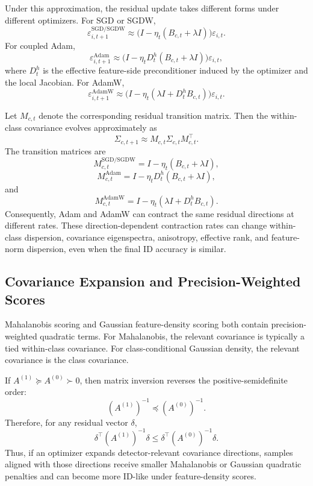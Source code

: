 Under this approximation, the residual update takes different forms under
different optimizers. For SGD or SGDW,
\[
    \varepsilon_{i,t+1}^{\mathrm{SGD/SGDW}}
    \approx
    \bigl(I-\eta_t(B_{c,t}+\lambda I)\bigr)\varepsilon_{i,t}.
\]
For coupled Adam,
\[
    \varepsilon_{i,t+1}^{\mathrm{Adam}}
    \approx
    \bigl(I-\eta_tD_t^h(B_{c,t}+\lambda I)\bigr)\varepsilon_{i,t},
\]
where \(D_t^h\) is the effective feature-side preconditioner induced by the
optimizer and the local Jacobian. For AdamW,
\[
    \varepsilon_{i,t+1}^{\mathrm{AdamW}}
    \approx
    \bigl(I-\eta_t(\lambda I+D_t^hB_{c,t})\bigr)\varepsilon_{i,t}.
\]

Let \(M_{c,t}\) denote the corresponding residual transition matrix. Then the
within-class covariance evolves approximately as
\[
    \Sigma_{c,t+1}
    \approx
    M_{c,t}\Sigma_{c,t}M_{c,t}^{\top}.
\]
The transition matrices are
\[
    M_{c,t}^{\mathrm{SGD/SGDW}}
    =
    I-\eta_t(B_{c,t}+\lambda I),
\]
\[
    M_{c,t}^{\mathrm{Adam}}
    =
    I-\eta_tD_t^h(B_{c,t}+\lambda I),
\]
and
\[
    M_{c,t}^{\mathrm{AdamW}}
    =
    I-\eta_t(\lambda I+D_t^hB_{c,t}).
\]
Consequently, Adam and AdamW can contract the same residual directions at
different rates. These direction-dependent contraction rates can change
within-class dispersion, covariance eigenspectra, anisotropy, effective rank,
and feature-norm dispersion, even when the final ID accuracy is similar.

\subsection{Covariance Expansion and Precision-Weighted Scores}
\label{app:covariance-expansion-precision}

Mahalanobis scoring and Gaussian feature-density scoring both contain
precision-weighted quadratic terms. For Mahalanobis, the relevant covariance is
typically a tied within-class covariance. For class-conditional Gaussian density,
the relevant covariance is the class covariance.

If \(A^{(1)}\succeq A^{(0)}\succ 0\), then matrix inversion reverses the
positive-semidefinite order:
\[
    (A^{(1)})^{-1}\preceq (A^{(0)})^{-1}.
\]
Therefore, for any residual vector \(\delta\),
\[
    \delta^\top(A^{(1)})^{-1}\delta
    \le
    \delta^\top(A^{(0)})^{-1}\delta.
\]
Thus, if an optimizer expands detector-relevant covariance directions, samples
aligned with those directions receive smaller Mahalanobis or Gaussian quadratic
penalties and can become more ID-like under feature-density scores.

